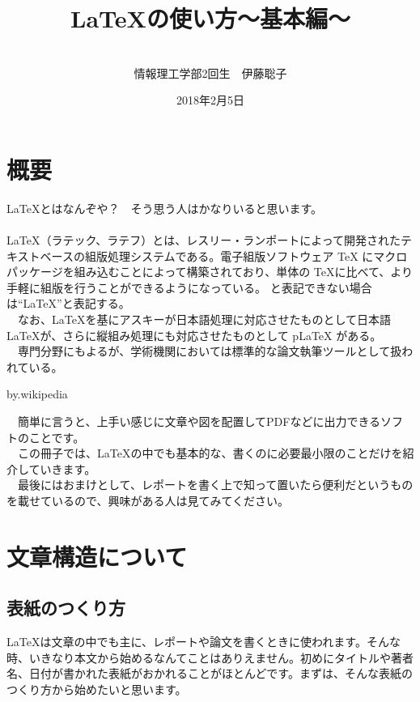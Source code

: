 \documentclass[a4j]{jarticle}
\begin{document}
%
%
\begin{titlepage}
\title{\LaTeX の使い方～基本編～}
\author{
\\
情報理工学部2回生　伊藤聡子　
\\
}
\date{2018年2月5日}
\maketitle
\thispagestyle{empty}
\newpage
\end{titlepage}
%
%
\tableofcontents
\newpage
%
%
\section{概要}
\LaTeX とはなんぞや？　そう思う人はかなりいると思います。\\
\\
  \LaTeX （ラテック、ラテフ）とは、レスリー・ランポートによって開発されたテキストベースの組版処理システムである。電子組版ソフトウェア TeX にマクロパッケージを組み込むことによって構築されており、単体の \TeX に比べて、より手軽に組版を行うことができるようになっている。 と表記できない場合は“\LaTeX ”と表記する。\\
　なお、\LaTeX を基にアスキーが日本語処理に対応させたものとして日本語 \LaTeX が、さらに縦組み処理にも対応させたものとして pLaTeX がある。\\
　専門分野にもよるが、学術機関においては標準的な論文執筆ツールとして扱われている。
\begin{flushright}
 by.wikipedia
\end{flushright}
　簡単に言うと、上手い感じに文章や図を配置してPDFなどに出力できるソフトのことです。\\
　この冊子では、\LaTeX の中でも基本的な、書くのに必要最小限のことだけを紹介していきます。\\
　最後にはおまけとして、レポートを書く上で知って置いたら便利だというものを載せているので、興味がある人は見てみてください。

\newpage

%
%
\section{文章構造について}
%
%
\subsection{表紙のつくり方}
\LaTeX は文章の中でも主に、レポートや論文を書くときに使われます。そんな時、いきなり本文から始めるなんてことはありえません。初めにタイトルや著者名、日付が書かれた表紙がおかれることがほとんどです。まずは、そんな表紙のつくり方から始めたいと思います。\\
\end{document}
